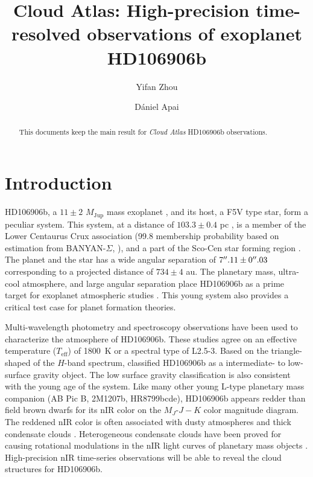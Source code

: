 \documentclass[twocolumn]{aastex62}
\newcommand{\mjup}{\ensuremath{M_\mathrm{Jup}}\xspace}
\newcommand{\teff}{\ensuremath{T_{\mathrm{eff}}}\xspace}
\begin{document}
\title{Cloud Atlas: High-precision time-resolved observations of exoplanet HD106906b}


\author{Yifan Zhou}

\author{D\'aniel Apai}

\begin{abstract}
  This documents keep the main result for \emph{Cloud Atlas} HD106906b \citep{Bailey2013} observations.
\end{abstract}

\keywords{}
\listoftodos

\section{Introduction}

HD106906b, a $11\pm2$ \mjup  mass exoplanet \citep{Bailey2013}, and its host, a F5V type star, form a peculiar system. This system, at a distance of $103.3\pm0.4$ pc \citep{Gaia2016,Gaia2018}, is a member of the Lower Centaurus Crux association (99.8 membership probability based on estimation from BANYAN-$\Sigma$, \citealt{Gagne2018} ), and a part of the Sco-Cen star forming region \citep[average age: $15\pm3$ Myr][]{Pecaut2016}. The planet and the star has a wide angular separation of $7\mbox{$^{\prime\prime}$}.11\pm0\mbox{$^{\prime\prime}$}.03$ corresponding to a projected distance of $734\pm4$ au. The planetary mass, ultra-cool atmosphere, and large angular separation place HD106906b as a prime target for exoplanet atmospheric studies \citep{Bailey2013,Kalas2015,Wu2016,Daemgen2017}. This young system also provides a critical test case for planet formation theories.

Multi-wavelength photometry \citep{Bailey2013,Kalas2015,Wu2016} and spectroscopy \citep{Daemgen2017} observations have been used to characterize the atmosphere of HD106906b.  These studies agree on an effective temperature (\teff) of 1800~K or a spectral type of L2.5-3. Based on the triangle-shaped of the $H$-band spectrum, \citet{Bailey2013, Daemgen2017} classified HD106906b as a intermediate- to low-surface gravity object. The low surface gravity classification is also consistent with the young age of the system. Like many other young L-type planetary mass companion (AB Pic B, 2M1207b, HR8799bcde), HD106906b appears redder than field brown dwarfs for its nIR color on the $M_{J}$-$J-K$ color magnitude diagram. The reddened nIR color is often associated with dusty atmospheres and thick condensate clouds \citep[e.g.,][]{Skemer2011}. Heterogeneous condensate clouds have been proved for causing rotational modulations in the nIR light curves of planetary mass objects \citep[e.g.,][]{Zhou2016,Vos2017,Biller2017,Biller2015,Lew2016,Manjavacas2017,Zhou2019}. High-precision nIR time-series observations will be able to reveal the cloud structures for HD106906b.
\end{document}
